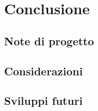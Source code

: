 \section{Conclusione}

\subsection{Note di progetto}



\subsection{Considerazioni}


\subsection{Sviluppi futuri}